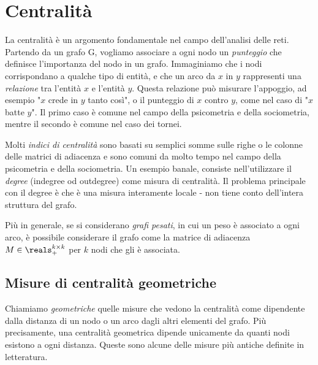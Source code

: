 \chapter{Centralità}
La centralità è un argomento fondamentale nel campo dell'analisi delle reti. Partendo da un grafo G, vogliamo associare a ogni nodo un \textit{punteggio} che definisce l'importanza del nodo in un grafo. Immaginiamo che i nodi corrispondano a qualche tipo di entità, e che un arco da $x$ in $y$ rappresenti una \textit{relazione} tra l'entità $x$ e l'entità $y$. Questa relazione può misurare l'appoggio, ad esempio "$x$ crede in $y$ tanto così", o il punteggio di $x$ contro $y$, come nel caso di "$x$ batte $y$". Il primo caso è comune nel campo della psicometria e della sociometria, mentre il secondo è comune nel caso dei tornei.

Molti \textit{indici di centralità} sono basati su semplici somme sulle righe o le colonne delle matrici di adiacenza e sono comuni da molto tempo nel campo della psicometria e della sociometria. Un esempio banale, consiste nell'utilizzare il \textit{degree} (indegree od outdegree) come misura di centralità. Il problema principale con il degree è che è una misura interamente locale - non tiene conto dell'intera struttura del grafo.

Più in generale, se si considerano \textit{grafi pesati}, in cui un peso è associato a ogni arco, è possibile considerare il grafo come la matrice di adiacenza $M \in \reals_+^{k \times k}$ per $k$ nodi che gli è associata.
\section{Misure di centralità geometriche}
Chiamiamo \textit{geometriche} quelle misure che vedono la centralità come dipendente dalla distanza di un nodo o un arco dagli altri elementi del grafo. Più precisamente, una centralità geometrica dipende unicamente da quanti nodi esistono a ogni distanza. Queste sono alcune delle misure più antiche definite in letteratura.
